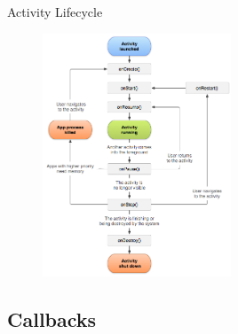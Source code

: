 \documentclass{beamer}
\begin{document}
\begin{frame}{Activity Lifecycle}
  \begin{figure}
    \includegraphics[width=0.5\textwidth]{figures/activity_lifecycle.png}
  \end{figure}
\end{frame}

\subsection{Callbacks}
\end{document}
